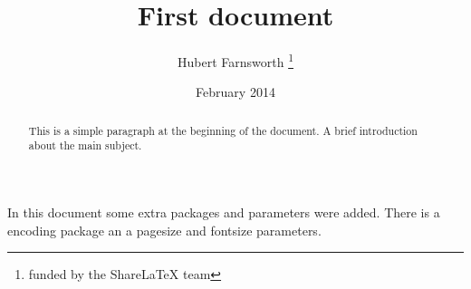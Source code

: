 \documentclass[12pt, letterpaper, twoside]{article}
\title{First document}
\author{Hubert Farnsworth \thanks{funded by the ShareLaTeX team}}
\date{February 2014}
\begin{document}
 
\begin{titlepage}
\maketitle
\end{titlepage}

\begin{abstract}
This is a simple paragraph at the beginning of the 
document. A brief introduction about the main subject.
\end{abstract}
 
In this document some extra packages and parameters
were added. There is a encoding package
an a pagesize and fontsize parameters.
 
\end{document}
